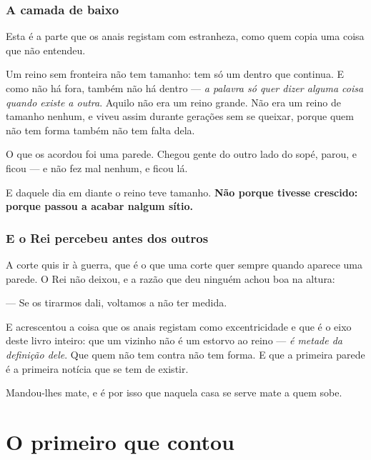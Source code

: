 \documentclass[livro.tex]{subfiles}
\begin{document}
\subsection*{A camada de baixo}

Esta é a parte que os anais registam com estranheza, como quem copia uma coisa que não entendeu.

\medskip

Um reino sem fronteira não tem tamanho: tem só um dentro que continua. E como não há fora, também
não há dentro --- \emph{a palavra só quer dizer alguma coisa quando existe a outra}. Aquilo não era
um reino grande. Não era um reino de tamanho nenhum, e viveu assim durante gerações sem se
queixar, porque quem não tem forma também não tem falta dela.

\medskip

O que os acordou foi uma parede. Chegou gente do outro lado do sopé, parou, e ficou --- e não fez
mal nenhum, e ficou lá.

\medskip

E daquele dia em diante o reino teve tamanho. \textbf{Não porque tivesse crescido: porque passou a
acabar nalgum sítio.}

\subsection*{E o Rei percebeu antes dos outros}

A corte quis ir à guerra, que é o que uma corte quer sempre quando aparece uma parede. O Rei não
deixou, e a razão que deu ninguém achou boa na altura:

\medskip

--- Se os tirarmos dali, voltamos a não ter medida.

\medskip

E acrescentou a coisa que os anais registam como excentricidade e que é o eixo deste livro
inteiro: que um vizinho não é um estorvo ao reino --- \emph{é metade da definição dele}. Que quem
não tem contra não tem forma. E que a primeira parede é a primeira notícia que se tem de existir.

\medskip

Mandou-lhes mate, e é por isso que naquela casa se serve mate a quem sobe.


\chapter{O primeiro que contou}
\end{document}
